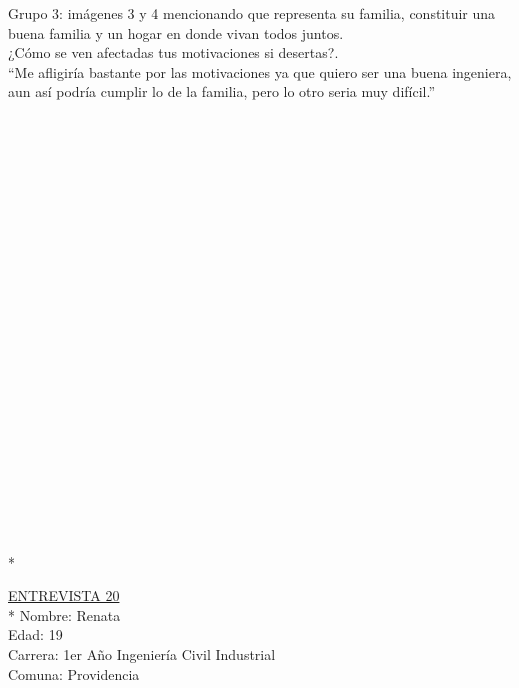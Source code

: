 Grupo 3: imágenes 3 y 4 mencionando que representa su familia, constituir una buena familia y un hogar en donde vivan todos juntos.\\


¿Cómo se ven afectadas tus motivaciones si desertas?.\\

``Me afligiría bastante por las motivaciones ya que quiero ser una buena ingeniera, aun así podría cumplir lo de la familia, pero lo otro seria muy difícil.''\\
\\
\\
\\
\\
\\
\\
\\
\\
\\
\\
\\
\\
\\
\\
\\
\\
\\
\\
\\
\\
\\
\\
\\*

\underline {ENTREVISTA 20}\\*
Nombre: Renata\\
Edad: 19\\
Carrera: 1er Año Ingeniería Civil Industrial \\
Comuna: Providencia\\

